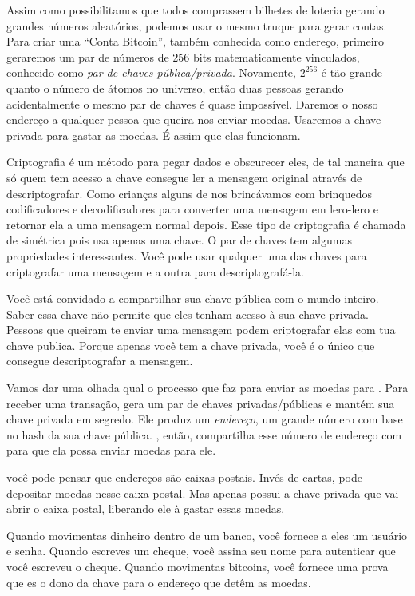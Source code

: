 Assim como possibilitamos que todos comprassem bilhetes de loteria gerando grandes números aleatórios, podemos usar o mesmo truque para gerar contas. Para criar uma “Conta Bitcoin”, também conhecida como endereço, primeiro geraremos um par de números de 256 bits matematicamente vinculados, conhecido como \textit{par de chaves pública/privada}. Novamente, \(2^{256}\) é tão grande quanto o número de átomos no universo, então duas pessoas gerando acidentalmente o mesmo par de chaves é quase impossível.
Daremos o nosso endereço a qualquer pessoa que queira nos enviar moedas. Usaremos a chave privada para gastar as moedas.%
É assim que elas funcionam.%

Criptografia é um método para pegar dados e obscurecer eles, de tal maneira que só quem tem acesso a chave consegue ler a mensagem original através de descriptografar.
Como crianças alguns de nos brincávamos com brinquedos codificadores e decodificadores para converter uma mensagem em lero-lero e retornar ela a uma mensagem normal depois.
Esse tipo de criptografia é chamada de simétrica pois usa apenas uma chave. 
O par de chaves tem algumas propriedades interessantes. Você pode usar qualquer uma das chaves para criptografar uma mensagem e a outra para descriptografá-la.

Você está convidado a compartilhar sua chave pública com o mundo inteiro. Saber essa chave não permite que eles tenham acesso à sua chave privada.
Pessoas que queiram te enviar uma mensagem podem criptografar elas com tua chave publica.
Porque apenas você tem a chave privada, você é o único que consegue descriptografar a mensagem.

Vamos dar uma olhada qual o processo que \TraducaoNomeA faz para enviar as moedas para \TraducaoNomeB.
Para receber uma transação, \TraducaoNomeB gera um par de chaves privadas/públicas e mantém sua chave privada em segredo. 
Ele produz um \textit{endereço}, um grande número com base no hash da sua chave pública. 
\TraducaoNomeB, então, compartilha esse número de endereço com \TraducaoNomeA para que ela possa enviar moedas para ele.

você pode pensar que endereços são caixas postais. 
Invés de cartas, \TraducaoNomeA pode depositar moedas nesse caixa postal. 
Mas apenas \TraducaoNomeB possui a chave privada que vai abrir o caixa postal, liberando ele à gastar essas moedas.

Quando movimentas dinheiro dentro de um banco, você fornece a eles um usuário e senha.
Quando escreves um cheque, você assina seu nome para autenticar que você escreveu o cheque.
Quando movimentas bitcoins, você fornece uma prova que es o dono da chave para o endereço que detêm as moedas.

